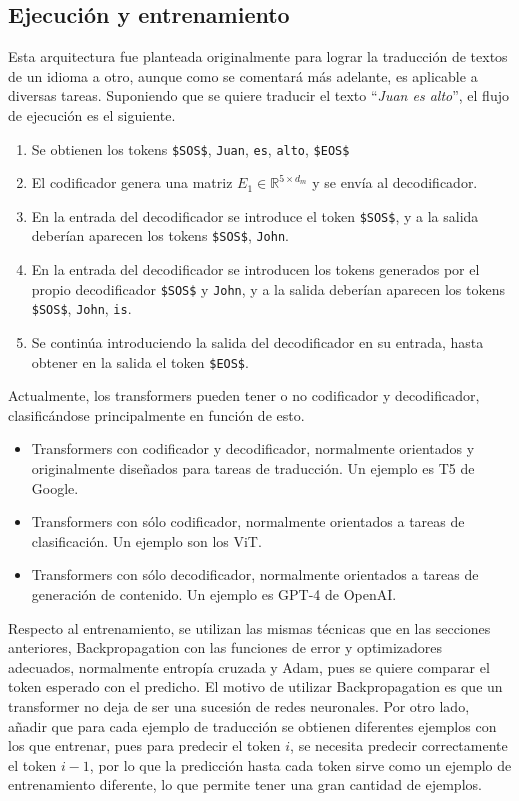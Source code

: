 			\subsection{Ejecución y entrenamiento}
			
				Esta arquitectura fue planteada originalmente para lograr la traducción de textos de un idioma a otro, aunque como se comentará más adelante, es aplicable a diversas tareas. Suponiendo que se quiere traducir el texto ``\textit{Juan es alto}'', el flujo de ejecución es el siguiente. 
				\begin{enumerate}[label = \textbf{\arabic*. }]
					\item Se obtienen los tokens \texttt{\$SOS\$}, \texttt{Juan}, \texttt{es}, \texttt{alto}, \texttt{\$EOS\$}
					\item El codificador genera una matriz $E_1 \in \mathbb{R}^{5 \times d_m}$ y se envía al decodificador. 
					\item En la entrada del decodificador se introduce el token \texttt{\$SOS\$}, y a la salida deberían aparecen los tokens \texttt{\$SOS\$}, \texttt{John}. 
					\item En la entrada del decodificador se introducen los tokens generados por el propio decodificador \texttt{\$SOS\$} y \texttt{John}, y a la salida deberían aparecen los tokens \texttt{\$SOS\$}, \texttt{John}, \texttt{is}.
					\item Se continúa introduciendo la salida del decodificador en su entrada, hasta obtener en la salida el token \texttt{\$EOS\$}.
				\end{enumerate}
				
				Actualmente, los transformers pueden tener o no codificador y decodificador, clasificándose principalmente en función de esto. 
				\begin{itemize}
					\item Transformers con codificador y decodificador, normalmente orientados y originalmente diseñados para tareas de traducción. Un ejemplo es T5 de Google. 
					\item Transformers con sólo codificador, normalmente orientados a tareas de clasificación. Un ejemplo son los ViT. 
					\item Transformers con sólo decodificador, normalmente orientados a tareas de generación de contenido. Un ejemplo es GPT-4 de OpenAI. 
				\end{itemize}
				
				Respecto al entrenamiento, se utilizan las mismas técnicas que en las secciones anteriores, Backpropagation con las funciones de error y optimizadores adecuados, normalmente entropía cruzada y Adam, pues se quiere comparar el token esperado con el predicho. El motivo de utilizar Backpropagation es que un transformer no deja de ser una sucesión de redes neuronales. Por otro lado, añadir que para cada ejemplo de traducción se obtienen diferentes ejemplos con los que entrenar, pues para predecir el token $i$, se necesita predecir correctamente el token $i-1$, por lo que la predicción hasta cada token sirve como un ejemplo de entrenamiento diferente, lo que permite tener una gran cantidad de ejemplos. 
				
